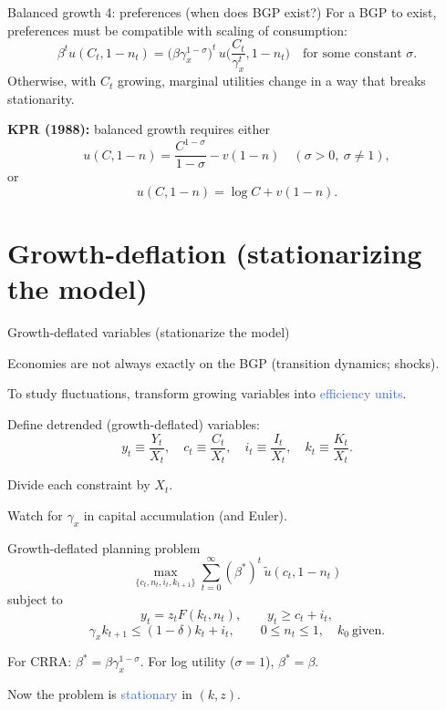 \documentclass[aspectratio=169,xcolor=dvipsnames]{beamer}
\let\tempone\itemize
\let\temptwo\enditemize
\renewenvironment{itemize}{\tempone\addtolength{\itemsep}{\fill}}{\temptwo}
\providecommand{\blue}[1]{\textcolor{RoyalBlue}{#1}}
\providecommand{\red}[1]{\textcolor{BrickRed}{#1}}
\begin{document}
\begin{frame}{Balanced growth 4: preferences (when does BGP exist?)}
\label{slide:BC_BGP_Prefs}
\small
For a BGP to exist, preferences must be compatible with scaling of consumption:
\[
\beta^t u(C_t,1-n_t)
= \big(\beta \gamma_x^{1-\sigma}\big)^t\, u\Big(\frac{C_t}{\gamma_x^t}, 1-n_t\Big)
\quad\text{for some constant }\sigma.
\]
Otherwise, with \(C_t\) growing, marginal utilities change in a way that breaks stationarity.

\vspace{0.4em}
\textbf{KPR (1988):} balanced growth requires either
\[
 u(C,1-n)=\frac{C^{1-\sigma}}{1-\sigma}-v(1-n)\quad (\sigma>0,\ \sigma\ne 1),
\]
or
\[
 u(C,1-n)=\log C + v(1-n).
\]
\end{frame}

\section[Deflation]{Growth-deflation (stationarizing the model)}

\begin{frame}{Growth-deflated variables (stationarize the model)}
\label{slide:BC_DeflatedVars}
\small
\begin{itemize}
    \item Economies are not always exactly on the BGP (transition dynamics; shocks).
    \item To study fluctuations, transform growing variables into \blue{efficiency units}.
\end{itemize}

\vspace{0.5em}
Define detrended (growth-deflated) variables:
\[
 y_t\equiv \frac{Y_t}{X_t},\quad
 c_t\equiv \frac{C_t}{X_t},\quad
 i_t\equiv \frac{I_t}{X_t},\quad
 k_t\equiv \frac{K_t}{X_t}.
\]

\begin{itemize}
    \item Divide each constraint by \(X_t\).
    \item \red{Watch for \(\gamma_x\)} in capital accumulation (and Euler).
\end{itemize}
\end{frame}

\begin{frame}{Growth-deflated planning problem}
\label{slide:BC_DeflatedPlanner}
\small
\[
\max_{\{c_t,n_t,i_t,k_{t+1}\}} \sum_{t=0}^{\infty}(\beta^*)^t\,\tilde u(c_t,1-n_t)
\]
subject to
\[
 y_t = z_t F(k_t,n_t),
\qquad
 y_t \ge c_t + i_t,
\]
\[
 \gamma_x k_{t+1} \le (1-\delta)k_t + i_t,
\qquad
 0\le n_t\le 1,\quad k_0\ \text{given.}
\]
\begin{itemize}
    \item For CRRA: \(\beta^* = \beta\gamma_x^{1-\sigma}\). For log utility (\(\sigma=1\)), \(\beta^*=\beta\).
    \item Now the problem is \blue{stationary} in \((k,z)\).
\end{itemize}
\end{frame}
\end{document}
